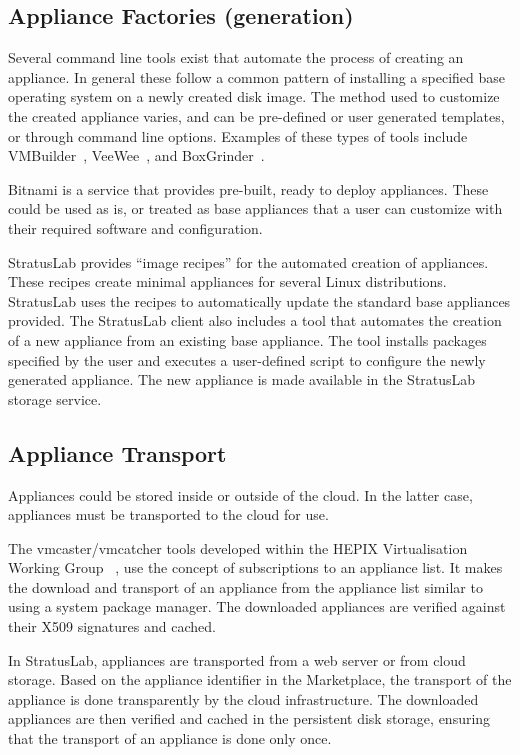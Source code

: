 \subsection{Appliance Factories (generation)}

Several command line tools exist that automate the process of creating an appliance. In general these follow 
a common pattern of installing a specified base operating system on a newly created disk image. The method used to 
customize the created appliance varies, and can be pre-defined or user generated templates, or through command line options. 
Examples of these types of tools include VMBuilder~\cite{vmbuilder}, VeeWee~\cite{veewee}, and BoxGrinder~\cite{boxgrinder}.

Bitnami is a service that provides pre-built, ready to deploy appliances.
These could be used as is, or treated as base appliances that a user can customize with their 
required software and configuration.

StratusLab provides ``image recipes'' for the automated creation of appliances. 
These recipes create minimal appliances for several Linux distributions. StratusLab uses 
the recipes to automatically update the standard base appliances provided. The StratusLab 
client also includes a tool that automates the creation of a new appliance from an existing base appliance.
The tool installs packages specified by the user and executes a user-defined  
script to configure the newly generated appliance. The new appliance is made available 
in the StratusLab storage service.

\subsection{Appliance Transport}

Appliances could be stored inside or outside of the cloud. In the latter case, 
appliances must be transported to the cloud for use.

The vmcaster/vmcatcher tools developed within the HEPIX Virtualisation Working
Group ~\cite{hepixbooktransfer}, use the concept of subscriptions to an 
appliance list. It makes the download and transport of an appliance 
from the appliance list similar to using a system package manager.
The downloaded appliances are verified against their X509 signatures and cached.

In StratusLab, appliances are transported from a web
server or from cloud storage. Based on the appliance identifier in the Marketplace,
the transport of the appliance is done transparently by the cloud infrastructure.
The downloaded appliances are then verified and cached in the persistent disk storage,
ensuring that the transport of an appliance is done only once.

